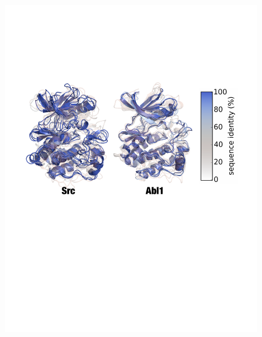 \documentclass{standalone}
\begin{document}
\begin{preview}
%
%
%
\begin{figure}[h]
 \includegraphics[width=1.0\columnwidth]{superposition-src_abl/superposed-seqid_classes-clustered-one_fig}

\end{figure}
\end{preview}
\end{document}
